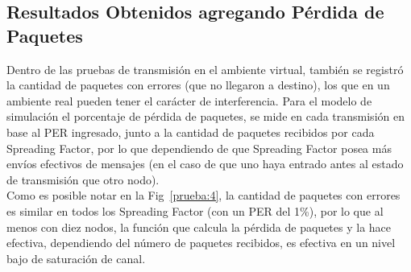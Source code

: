 \begin{justify}
\subsection{Resultados Obtenidos agregando Pérdida de Paquetes}
Dentro de las pruebas de transmisión en el ambiente virtual, también se registró la cantidad de paquetes con errores (que no llegaron a destino), los que en un ambiente real pueden tener el carácter de interferencia. Para el modelo de simulación el porcentaje de pérdida de paquetes, se mide en cada transmisión en base al PER ingresado, junto a la cantidad de paquetes recibidos por cada Spreading Factor, por lo que dependiendo de que Spreading Factor posea más envíos efectivos de mensajes (en el caso de que uno haya entrado antes al estado de transmisión que otro nodo).\\
Como es posible notar en la Fig~\ref{prueba:4}, la cantidad de paquetes con errores es similar en todos los Spreading Factor (con un PER del 1\%), por lo que al menos con diez nodos, la función que calcula la pérdida de paquetes y la hace efectiva, dependiendo del número de paquetes recibidos, es efectiva en un nivel bajo de saturación de canal.
\begin{figure}[!ht]
\centering

\end{figure}
\end{justify}
